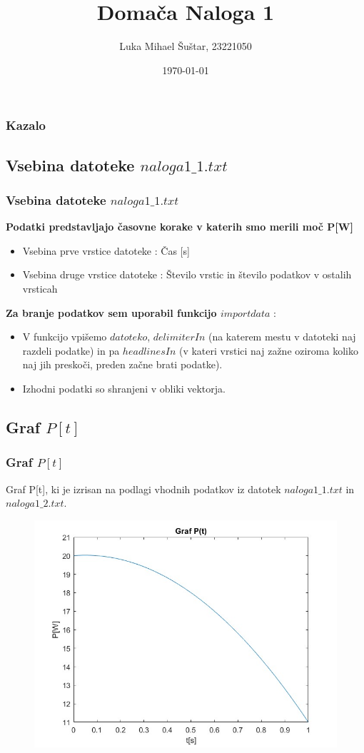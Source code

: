 \documentclass[10pt]{beamer}
\title{Domača Naloga 1}
\author{Luka Mihael Šuštar, 23221050}
\institute{Fakulteta za strojništvo, Univerza v Ljubljani}
\date{\today}
\begin{document}
 
\frame{\titlepage}

\begin{frame}
\frametitle{Kazalo}
 \tableofcontents[sectionstyle=show, subsectionstyle=show]
\end{frame}

\begin{frame} 
\section{Vsebina datoteke $naloga1\_1.txt$}
\frametitle{Vsebina datoteke $naloga1\_ 1.txt$}
\textbf{Podatki predstavljajo časovne korake v katerih smo merili moč P[W]}
\begin{itemize}
    \item Vsebina prve vrstice datoteke : Čas [s]
    \item Vsebina druge vrstice datoteke : Število vrstic in število podatkov v ostalih vrsticah
\end{itemize}
\vspace{5pt}
\textbf{Za branje podatkov sem uporabil funkcijo $importdata$} :
\begin{itemize}
    \item V funkcijo vpišemo $datoteko$, $delimiterIn$  (na katerem mestu v datoteki naj razdeli podatke) in pa $headlinesIn$ (v kateri vrstici naj zažne oziroma koliko naj jih preskoči, preden začne brati podatke).
    \item Izhodni podatki so shranjeni v obliki vektorja.
\end{itemize}
\end{frame}
\begin{frame} 


\section{Graf $P[t]$}
\frametitle{Graf $P[t]$}  
\vspace{10pt}
Graf P[t], ki je izrisan na podlagi vhodnih podatkov iz datotek $naloga1\_1.txt$ in $naloga1\_2.txt$.
\begin{figure}
    \centering
    \includegraphics[width=0.9\linewidth]{Graf P[t].jpg}
    \label{P(t)}
\end{figure}
\end{frame} 
\end{document}
